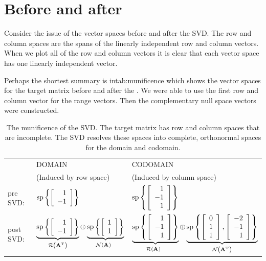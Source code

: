 \section{Before and after}
Consider the issue of the vector spaces before and after the SVD. The row and column spaces are the spans of the linearly independent row and column vectors. When we plot all of the row and column vectors it is clear that each vector space has one linearly independent vector.

Perhaps the shortest summary is in{tab:munificence} which shows the vector spaces for the target matrix before and after the \svdl. We were able to use the first row and column vector for the range vectors. Then the complementary null space vectors were constructed.
\begin{table}[htdp]
\begin{center}
\begin{tabular}{lll}
 & DOMAIN & CODOMAIN \\
 & (Induced by row space) & (Induced by column space) \\\hline\hline
 pre SVD: & $\spn \lst{\mat{r}{1\\-1}}$ & $\spn \lst{\mat{r}{1\\-1\\1}}$ \phantom{$\mat{c}{1\\1\\1\\1}$}\\[5pt]\hline
 post SVD:  & $\underbrace{\spn \lst{\mat{r}{1\\-1}}}_{\rng{\A{T}}} \oplus \underbrace{\spn \lst{\mat{r}{1\\1}}}_{\nll{\A{}}^{\phantom{T}}}$ & $\underbrace{\spn \lst{\mat{r}{1\\-1\\1}}}_{\rng{\A{}}^{\phantom{T}}} \oplus \underbrace{\spn \lst{\veca,\vecb}}_{\nll{\A{T}}}$ \\[35pt]\hline
\end{tabular}
\end{center}
\label{tab:munificence}
\caption{The munificence of the SVD. The target matrix has row and column spaces that are incomplete. The SVD resolves these spaces into complete, orthonormal spaces for the domain and codomain.}
\end{table}

